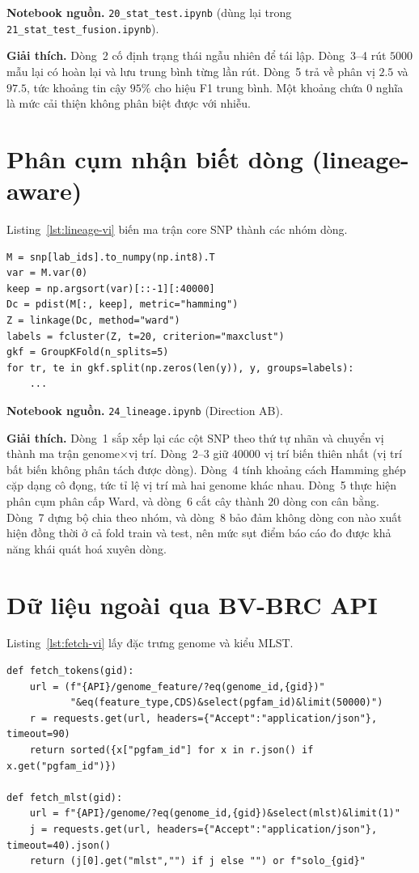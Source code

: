 \documentclass[../main.tex]{subfiles}
\begin{document}
\noindent\textbf{Notebook nguồn.} \texttt{20\_stat\_test.ipynb} (dùng lại trong \texttt{21\_stat\_test\_fusion.ipynb}).

\noindent\textbf{Giải thích.} Dòng~2 cố định trạng thái ngẫu nhiên để tái lập. Dòng~3--4 rút $5000$ mẫu lại có hoàn lại và lưu trung bình từng lần rút. Dòng~5 trả về phân vị $2.5$ và $97.5$, tức khoảng tin cậy $95\%$ cho hiệu F1 trung bình. Một khoảng chứa $0$ nghĩa là mức cải thiện không phân biệt được với nhiễu.

\section{Phân cụm nhận biết dòng (lineage-aware)}

Listing~\ref{lst:lineage-vi} biến ma trận core SNP thành các nhóm dòng.

\begin{lstlisting}[caption={Khoảng cách core-SNP và phân cụm Ward.},label=lst:lineage-vi]
M = snp[lab_ids].to_numpy(np.int8).T
var = M.var(0)
keep = np.argsort(var)[::-1][:40000]
Dc = pdist(M[:, keep], metric="hamming")
Z = linkage(Dc, method="ward")
labels = fcluster(Z, t=20, criterion="maxclust")
gkf = GroupKFold(n_splits=5)
for tr, te in gkf.split(np.zeros(len(y)), y, groups=labels):
    ...
\end{lstlisting}

\noindent\textbf{Notebook nguồn.} \texttt{24\_lineage.ipynb} (Direction AB).

\noindent\textbf{Giải thích.} Dòng~1 sắp xếp lại các cột SNP theo thứ tự nhãn và chuyển vị thành ma trận genome$\times$vị trí. Dòng~2--3 giữ $40000$ vị trí biến thiên nhất (vị trí bất biến không phân tách được dòng). Dòng~4 tính khoảng cách Hamming ghép cặp dạng cô đọng, tức tỉ lệ vị trí mà hai genome khác nhau. Dòng~5 thực hiện phân cụm phân cấp Ward, và dòng~6 cắt cây thành $20$ dòng con cân bằng. Dòng~7 dựng bộ chia theo nhóm, và dòng~8 bảo đảm không dòng con nào xuất hiện đồng thời ở cả fold train và test, nên mức sụt điểm báo cáo đo được khả năng khái quát hoá xuyên dòng.

\section{Dữ liệu ngoài qua BV-BRC API}

Listing~\ref{lst:fetch-vi} lấy đặc trưng genome và kiểu MLST.

\begin{lstlisting}[caption={Lấy đặc trưng pgfam và MLST từ BV-BRC.},label=lst:fetch-vi]
def fetch_tokens(gid):
    url = (f"{API}/genome_feature/?eq(genome_id,{gid})"
           "&eq(feature_type,CDS)&select(pgfam_id)&limit(50000)")
    r = requests.get(url, headers={"Accept":"application/json"}, timeout=90)
    return sorted({x["pgfam_id"] for x in r.json() if x.get("pgfam_id")})

def fetch_mlst(gid):
    url = f"{API}/genome/?eq(genome_id,{gid})&select(mlst)&limit(1)"
    j = requests.get(url, headers={"Accept":"application/json"}, timeout=40).json()
    return (j[0].get("mlst","") if j else "") or f"solo_{gid}"
\end{lstlisting}
\end{document}
